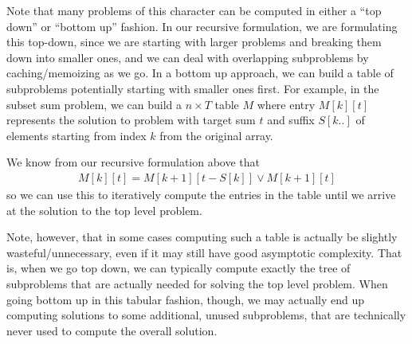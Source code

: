 \documentclass[10pt,a4paper]{article}
\begin{document}
Note that many problems of this character can be computed in either a ``top down'' or ``bottom up'' fashion. In our recursive formulation, we are formulating this top-down, since we are starting with larger problems and breaking them down into smaller ones, and we can deal with overlapping subproblems by caching/memoizing as we go. In a bottom up approach, we can build a table of subproblems potentially starting with smaller ones first. For example, in the subset sum problem, we can build a $n \times T$ table $M$ where entry $M[k][t]$ represents the solution to problem with target sum $t$ and suffix $S[k..]$ of elements starting from index $k$ from the original array. 



We know from our recursive formulation above that
\begin{align*}
    M[k][t] = M[k+1][t-S[k]] \vee M[k+1][t]
\end{align*}
so we can use this to iteratively compute the entries in the table until we arrive at the solution to the top level problem. 

Note, however, that in some cases computing such a table is actually be slightly wasteful/unnecessary, even if it may still have good asymptotic complexity. That is, when we go top down, we can typically compute exactly the tree of subproblems that are actually needed for solving the top level problem. When going bottom up in this tabular fashion, though, we may actually end up computing solutions to some additional, unused subproblems, that are technically never used to compute the overall solution.
\end{document}
